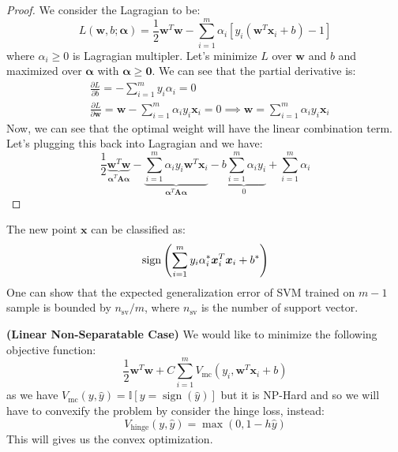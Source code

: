 \begin{proof}
    We consider the Lagragian to be:
    \begin{equation*}
        L(\boldsymbol w, b; \boldsymbol \alpha) = \frac{1}{2}\boldsymbol w^T\boldsymbol w - \sum^m_{i=1}\alpha_i[y_i(\boldsymbol w^T\boldsymbol x_i + b) - 1]
    \end{equation*}
    where $\alpha_i\ge0$ is Lagragian multipler. Let's minimize $L$ over $\boldsymbol w$ and $b$ and maximized over $\boldsymbol \alpha$ with $\boldsymbol \alpha \ge \boldsymbol 0$. We can see that the partial derivative is:
    \begin{equation*}
    \begin{aligned}
        &\frac{\partial L}{\partial b} = -\sum^m_{i=1}y_i\alpha_i = 0 \\
        &\frac{\partial L}{\partial \boldsymbol w} = \boldsymbol w - \sum^m_{i=1}\alpha_iy_i\boldsymbol x_i = 0 \implies \boldsymbol w = \sum^m_{i=1}\alpha_iy_i\boldsymbol x_i
    \end{aligned}
    \end{equation*}
    Now, we can see that the optimal weight will have the linear combination term. Let's plugging this back into Lagragian and we have:
    \begin{equation*}
        \frac{1}{2}\underbrace{\boldsymbol w^T\boldsymbol w}_{\boldsymbol \alpha^T\boldsymbol A\boldsymbol \alpha} - \underbrace{\sum^m_{i=1}\alpha_iy_i\boldsymbol w^T\boldsymbol x_i}_{\boldsymbol \alpha^T\boldsymbol A\boldsymbol \alpha} - \underbrace{b\sum^m_{i=1}\alpha_iy_i}_{0} + \sum^m_{i=1}\alpha_i
    \end{equation*}
\end{proof}
\begin{remark}
    The new point $\boldsymbol x$ can be classified as:
    \begin{equation*}
        \operatorname{sign}\left( \sum^m_{i=1}y_i\alpha^*_i\boldsymbol x_i^T\boldsymbol x_i + b^* \right)
    \end{equation*}   
    One can show that the expected generalization error of SVM trained on $m-1$ sample is bounded by $n_\text{sv}/m$, where $n_\text{sv}$ is the number of support vector.
\end{remark}

\begin{remark}{\textbf{(Linear Non-Separatable Case)}}
    We would like to minimize the following objective function:
    \begin{equation*}
        \frac{1}{2}\boldsymbol w^T\boldsymbol w + C\sum^m_{i=1}V_\text{mc}(y_i, \boldsymbol w^T\boldsymbol x_i + b)
    \end{equation*}
    as we have $V_\text{mc}(y, \hat{y}) = \mathbb{I}[y = \operatorname{sign}(\hat{y})]$ but it is NP-Hard and so we will have to convexify the problem by consider the hinge loss, instead:
    \begin{equation*}
        V_\text{hinge}(y, \hat{y}) = \max(0, 1-h\hat{y})
    \end{equation*}
    This will gives us the convex optimization. 
\end{remark}

